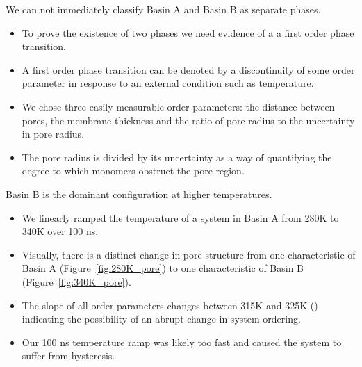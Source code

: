 \documentclass{article}
\begin{document}
  \graphicspath{{./figures/}}
  
  We can not immediately classify Basin A and Basin B as separate phases.
  \begin{itemize}
	\item To prove the existence of two phases we need evidence of a
	a first order phase transition.
	\item A first order phase transition can be denoted by a discontinuity
        of some order parameter in response to an external condition such as
	temperature.
	\item We chose three easily measurable order parameters: the distance
	between pores, the membrane thickness and the ratio of pore radius to
	the uncertainty in pore radius.  %
        \item The pore radius is divided by its uncertainty as a way of quantifying
        the degree to which monomers obstruct the pore region.
  \end{itemize}

  Basin B is the dominant configuration at higher temperatures.
  \begin{itemize}
	\item We linearly ramped the temperature of a system in Basin A 
	from 280K to 340K over 100 ns.
        \item Visually, there is a distinct change in pore structure from one
        characteristic of Basin A (Figure~\ref{fig:280K_pore}) to one characteristic of
        Basin B (Figure~\ref{fig:340K_pore}).
        \item The slope of all order parameters changes between 315K and 325K
	() indicating the
        possibility of an abrupt change in system ordering.
        \item Our 100 ns temperature ramp was likely too fast and caused the system
        to suffer from hysteresis.
  \end{itemize}
\end{document}
